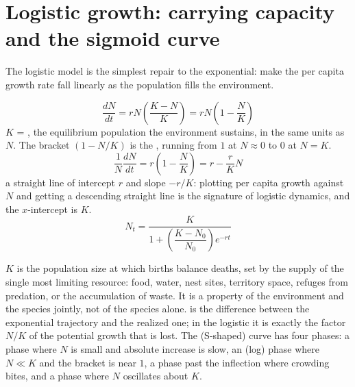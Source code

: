\section{Logistic growth: carrying capacity and the sigmoid curve}

The logistic model is the simplest repair to the exponential: make the per capita
growth rate fall linearly as the population fills the environment.

\begin{keybox}[title={MEMORIZE: the logistic equation in three equivalent forms}]
\[
\frac{dN}{dt}=rN\left(\frac{K-N}{K}\right)=rN\left(1-\frac{N}{K}\right)
\]
$K$ = , the equilibrium population the environment
sustains, in the same units as $N$. The bracket $(1-N/K)$ is the
, running from $1$ at $N\approx 0$ to
$0$ at $N=K$.
\[
\frac{1}{N}\frac{dN}{dt}=r\left(1-\frac{N}{K}\right)=r-\frac{r}{K}N
\]
a straight line of intercept $r$ and slope $-r/K$: plotting per capita growth
against $N$ and getting a descending straight line is the signature of logistic
dynamics, and the $x$-intercept is $K$.
\[
N_t=\frac{K}{1+\left(\dfrac{K-N_0}{N_0}\right)e^{-rt}}
\]
\end{keybox}

\begin{defbox}[title={DEFINITIONS: carrying capacity and environmental resistance}]
 $K$ is the population size at which births balance
deaths, set by the supply of the single most limiting resource: food, water,
nest sites, territory space, refuges from predation, or the accumulation of
waste. It is a property of the environment and the species jointly, not of the
species alone.
 is the difference between the exponential
trajectory and the realized one; in the logistic it is exactly the factor
$N/K$ of the potential growth that is lost.
The  (S-shaped) curve has four phases: a  phase where $N$ is
small and absolute increase is slow, an  (log) phase where
$N\ll K$ and the bracket is near $1$, a  phase past the
inflection where crowding bites, and a  phase where $N$ oscillates
about $K$.
\end{defbox}

